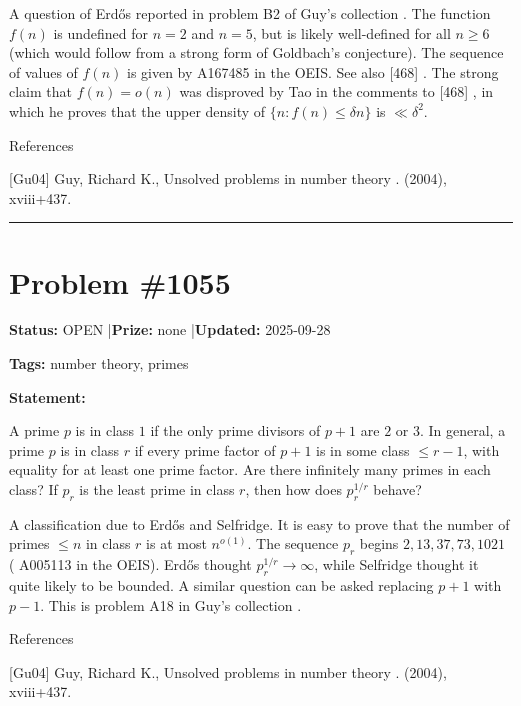 \documentclass{article}
\begin{document}
A question of Erd\H{o}s reported in problem B2 of Guy's collection \cite{Gu04}. The function $f(n)$ is undefined for $n=2$ and $n=5$, but is likely well-defined for all $n\geq 6$ (which would follow from a strong form of Goldbach's conjecture). The sequence of values of $f(n)$ is given by A167485 in the OEIS. See also [468] . The strong claim that $f(n)=o(n)$ was disproved by Tao in the comments to [468] , in which he proves that the upper density of $\{ n : f(n)\leq \delta n\}$ is $\ll \delta^2$.




References

[Gu04] Guy, Richard K., Unsolved problems in number theory . (2004), xviii+437.

\noindent\rule{\linewidth}{0.4pt}


\section{Problem \#1055}
\label{prob:1055}

\noindent\textbf{Status:} OPEN \quad|\quad \textbf{Prize:} none \quad|\quad \textbf{Updated:} 2025-09-28

\noindent\textbf{Tags:} number theory, primes

\medskip

\noindent\textbf{Statement:}

A prime $p$ is in class $1$ if the only prime divisors of $p+1$ are $2$ or $3$. In general, a prime $p$ is in class $r$ if every prime factor of $p+1$ is in some class $\leq r-1$, with equality for at least one prime factor. Are there infinitely many primes in each class? If $p_r$ is the least prime in class $r$, then how does $p_r^{1/r}$ behave?




A classification due to Erd\H{o}s and Selfridge. It is easy to prove that the number of primes $\leq n$ in class $r$ is at most $n^{o(1)}$. The sequence $p_r$ begins $2,13,37,73,1021$ ( A005113 in the OEIS). Erd\H{o}s thought $p_r^{1/r}\to \infty$, while Selfridge thought it quite likely to be bounded. A similar question can be asked replacing $p+1$ with $p-1$. This is problem A18 in Guy's collection \cite{Gu04}.




References

[Gu04] Guy, Richard K., Unsolved problems in number theory . (2004), xviii+437.
\end{document}
